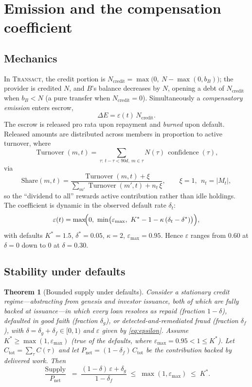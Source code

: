 \documentclass[11pt]{article}
\theoremstyle{plain}
\newtheorem{theorem}{Theorem}
\theoremstyle{definition}
\theoremstyle{remark}
\newcommand{\confidence}{\operatorname{confidence}}
\newcommand{\Supply}{\operatorname{Supply}}
\newcommand{\Turnover}{\operatorname{Turnover}}
\begin{document}
\section{Emission and the compensation coefficient}\label{sec:emission}

\subsection{Mechanics}

In \textsc{Transact}, the credit portion is $N_{\mathrm{credit}} = \max\bigl(0,\ N - \max(0,b_B)\bigr)$; the provider is credited $N$, and $B$'s balance decreases by $N$, opening a debt of $N_{\mathrm{credit}}$ when $b_B < N$ (a pure transfer when $N_{\mathrm{credit}}=0$). Simultaneously a \emph{compensatory emission} enters escrow,
\begin{equation}\label{eq:comp}
\Delta E = \varepsilon(t)\, N_{\mathrm{credit}} .
\end{equation}
The escrow is released pro rata upon repayment and \emph{burned} upon default. Released amounts are distributed across members in proportion to active turnover, where
\[
\Turnover(m,t) = \sum_{\tau:\ t-\tau<90d,\ m\in\tau} N(\tau)\,\confidence(\tau),
\]
via
\begin{equation}
\mathrm{Share}(m,t) = \frac{\Turnover(m,t) + \xi}{\sum_{m'}\Turnover(m',t) + n_t\,\xi}, \qquad \xi = 1,\ \ n_t=|M_t|,
\end{equation}
so the ``dividend to all'' rewards active contribution rather than idle holdings. The coefficient is dynamic in the observed default rate $\delta_t$:
\begin{equation}\label{eq:epsilon}
\varepsilon(t) = \max\!\Bigl(0,\ \min\bigl(\varepsilon_{\max},\ K^* - 1 - \kappa\,(\delta_t - \delta^*)\bigr)\Bigr),
\end{equation}
with defaults $K^* = 1.5$, $\delta^* = 0.05$, $\kappa = 2$, $\varepsilon_{\max}=0.95$. Hence $\varepsilon$ ranges from $0.60$ at $\delta=0$ down to $0$ at $\delta = 0.30$.

\subsection{Stability under defaults}

\begin{theorem}[Bounded supply under defaults]\label{thm:stability}
Consider a stationary credit regime---abstracting from genesis and investor issuance, both of which are fully backed at issuance---in which every loan resolves as repaid (fraction $1-\delta$), defaulted in good faith (fraction $\delta_g$), or detected-and-remediated fraud (fraction $\delta_f$), with $\delta=\delta_g+\delta_f\in[0,1)$ and $\varepsilon$ given by \eqref{eq:epsilon}. Assume $K^*\ge\max(1,\varepsilon_{\max})$ (true of the defaults, where $\varepsilon_{\max}=0.95<1\le K^*$). Let $C_{\mathrm{tot}}=\sum_\tau C(\tau)$ and let $P_{\mathrm{net}}=(1-\delta_f)\,C_{\mathrm{tot}}$ be the contribution backed by delivered work. Then
\[
\frac{\Supply}{P_{\mathrm{net}}} \;=\; \frac{(1-\delta)\,\varepsilon+\delta_g}{1-\delta_f}\;\le\;\max(1,\varepsilon_{\max})\;\le\;K^*.
\]
\end{theorem}
\end{document}
